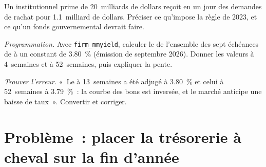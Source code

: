 \begin{exercise}[$\star\star$]\label{exo:m2:money-markets:6}
Un  institutionnel prime de 20~milliards de dollars reçoit en un jour des demandes de rachat
pour 1.1~milliard de dollars. Préciser ce qu'impose la règle de 2023, et ce qu'un fonds gouvernemental
devrait faire.
\end{exercise}

\begin{exercise}[$\star\star\star$]\label{exo:m2:money-markets:7}
\emph{Programmation.} Avec \texttt{firm\_mmyield}, calculer le 
de l'ensemble des sept échéances de  à un  constant de 3.80~\% (émission
de septembre 2026). Donner les valeurs à 4~semaines et à 52~semaines, puis expliquer la
pente.
\end{exercise}

\begin{exercise}[$\star\star\star$]\label{exo:m2:money-markets:8}
\emph{Trouver l'erreur.} «~Le  à 13~semaines a été adjugé à 3.80~\% et celui à
52~semaines à 3.79~\%~: la courbe des bons est inversée, et le marché anticipe une
baisse de taux~». Convertir et corriger.
\end{exercise}

\section{Problème~: placer la trésorerie à cheval sur la fin d'année}

